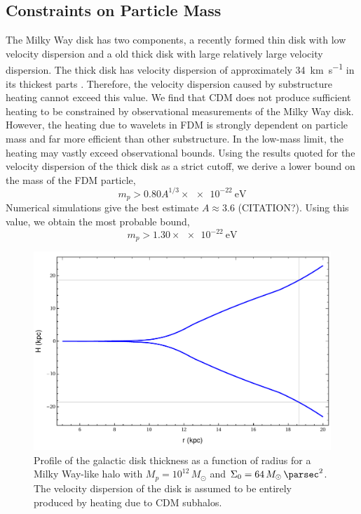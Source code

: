 \documentclass[usenatbib]{mnras}
\begin{document}
\subsection{Constraints on Particle Mass}

	The Milky Way disk has two components, a recently formed thin disk with low velocity dispersion and a old thick disk with large relatively large velocity dispersion. The thick disk has velocity dispersion of approximately \SI{34}{\kilo\meter\per\second} in its thickest parts \citep{milky_way}. Therefore, the velocity dispersion caused by substructure heating cannot exceed this value. We find that CDM does not produce sufficient heating to be constrained by observational measurements of the Milky Way disk. However, the heating due to wavelets in FDM is strongly dependent on particle mass and far more efficient than other substructure. In the low-mass limit, the heating may vastly exceed observational bounds. Using the results quoted for the velocity dispersion of the thick disk as a strict cutoff, we derive a lower bound on the mass of the FDM particle,
\begin{equation}
m_p > 0.80 A^{1/3} \times \SI{e-22}{\electronvolt}
\end{equation}
Numerical simulations give the best estimate $A \approx 3.6$ (CITATION?). Using this value, we obtain the most probable bound,
\[ m_p > 1.30 \times \SI{e-22}{\electronvolt} \]


\begin{figure}
\includegraphics[width=\columnwidth]{disk_shape_CDM}
\vspace*{-5mm}
\caption{Profile of the galactic disk thickness as a function of radius for a Milky Way-like halo with $M_p = 10^{12} \, M_\odot$ and $\Sigma_0 = 64 \, M_\odot \, \si{\per\parsec^2}$. The velocity dispersion of the disk is assumed to be entirely produced by heating due to CDM subhalos. }
\label{fig:disk_shape_CDM}
\end{figure}
\end{document}
